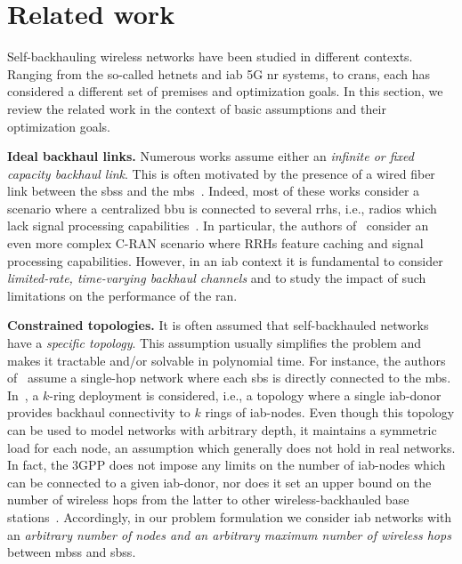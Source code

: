 \section {Related work}
\label{s:related}

Self-backhauling wireless networks have been studied in different contexts. Ranging from the so-called \glspl{hetnet} and \gls{iab} 5G \gls{nr} systems, to \glspl{cran}, each has considered a different set of premises and optimization goals. In this section, we review the related work in the context of basic assumptions and their optimization goals. 

\textbf{Ideal backhaul links.} Numerous works assume either an \textit{infinite or fixed capacity backhaul link}. This is often motivated by the presence of a wired fiber link between the \glspl{sbs} and the \gls{mbs}~\cite{pan2017joint, huang2015joint, nguyen2020nonsmooth, rasekh2015interference}. Indeed, most of these works consider a scenario where a centralized \gls{bbu} is connected to several \glspl{rrh}, i.e., radios which lack signal processing capabilities~\cite{pan2017joint, huang2015joint, nguyen2020nonsmooth}. In particular, the authors of~\cite{nguyen2020nonsmooth} consider an even more complex C-RAN scenario where RRHs feature caching and signal processing capabilities. However, in an \gls{iab} context it is fundamental to consider \textit{limited-rate, time-varying backhaul channels} and to study the impact of such limitations on the performance of the \gls{ran}.

\textbf{Constrained topologies.} It is often assumed that self-backhauled networks have a \textit{specific topology}. This assumption usually simplifies the problem and makes it tractable and/or solvable in polynomial time. For instance, the authors of~\cite{kwon2019joint, pizzo2017optimal, lei2020deep} assume a single-hop network where each \gls{sbs} is directly connected to the \gls{mbs}. In~\cite{kulkarni2018max}, a $k$-ring deployment is considered, i.e., a topology where a single \gls{iab}-donor provides backhaul connectivity to $k$ rings of \gls{iab}-nodes. Even though this topology can be used to model networks with arbitrary depth, it maintains a symmetric load for each node, an assumption which generally does not hold in real networks.
In fact, the 3GPP does not impose any limits on the number of \gls{iab}-nodes which can be connected to a given \gls{iab}-donor, nor does it set an upper bound on the number of wireless hops from the latter to other wireless-backhauled base stations~\cite{3gpp_38_874}. Accordingly, in our problem formulation we consider \gls{iab} networks with an \textit{arbitrary number of nodes and an arbitrary maximum number of wireless hops} between \glspl{mbs} and \glspl{sbs}. 

